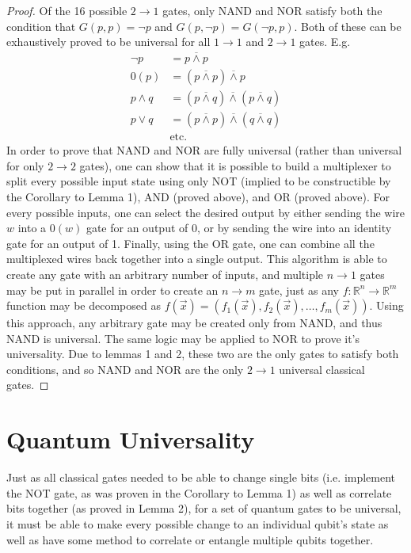 \documentclass[12pt]{article}
\newcommand{\nand}{\overline{\land}}
\begin{document}
\begin{proof}
    Of the 16 possible $2 \to 1$ gates, only NAND and NOR satisfy both the condition that $G(p, p) = \neg p$ and $G(p, \neg p) = G(\neg p, p)$.
    Both of these can be exhaustively proved to be universal for all $1 \to 1$ and $2 \to 1$ gates. E.g.
    \begin{align}
        \neg p &= p \nand p \\
        0(p) &= (p \nand p) \nand p \\
        p \land q &= (p \nand q) \nand (p \nand q) \\
        p \lor q &= (p \nand p) \nand (q \nand q) \\
        &\text{etc.}
    \end{align}
    In order to prove that NAND and NOR are fully universal (rather than universal for only $2 \to 2$ gates), one can show that it is possible to build a multiplexer to split every possible input state using only NOT (implied to be constructible by the Corollary to Lemma 1), AND (proved above), and OR (proved above). For every possible inputs, one can select the desired output by either sending the wire $w$ into a $0(w)$ gate for an output of 0, or by sending the wire into an identity gate for an output of 1. Finally, using the OR gate, one can combine all the multiplexed wires back together into a single output.
    This algorithm is able to create any gate with an arbitrary number of inputs, and multiple $n \to 1$ gates may be put in parallel in order to create an $n \to m$ gate, just as any $f: \mathbb{R}^n \to \mathbb{R}^m$ function may be decomposed as $f(\overrightarrow{x}) = (f_1(\overrightarrow{x}), f_2(\overrightarrow{x}), \dots, f_m(\overrightarrow{x}))$.
    Using this approach, any arbitrary gate may be created only from NAND, and thus NAND is universal. The same logic may be applied to NOR to prove it's universality. Due to lemmas 1 and 2, these two are the only gates to satisfy both conditions, and so NAND and NOR are the only $2 \to 1$ universal classical gates.
\end{proof}

\section{Quantum Universality}
Just as all classical gates needed to be able to change single bits (i.e. implement the NOT gate, as was proven in the Corollary to Lemma 1) as well as correlate bits together (as proved in Lemma 2), for a set of quantum gates to be universal, it must be able to make every possible change to an individual qubit's state as well as have some method to correlate or entangle multiple qubits together.
\end{document}
